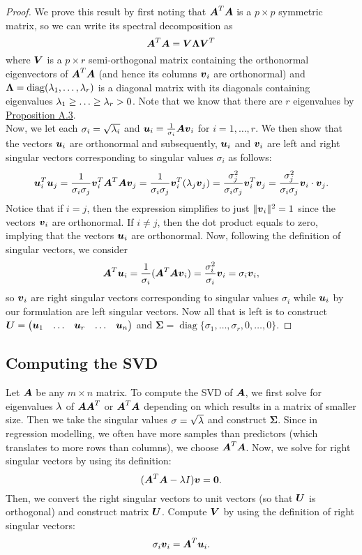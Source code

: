 \documentclass[12pt]{article}
\DeclareMathOperator{\diag}{diag}
\newcommand{\Sg}{\Sigma}
\begin{document}
	\begin{proof}
		We prove this result by first noting that $\boldsymbol{A}^T\boldsymbol{A}$ is a $p\times p$ symmetric matrix, so we can write its spectral decomposition as
		$$\boldsymbol{A}^T\boldsymbol{A}=\boldsymbol{V}\boldsymbol{\Lambda}\boldsymbol{V}^T$$
		where $\boldsymbol{V}$ is a $p\times r$ {semi-orthogonal} matrix containing the orthonormal eigenvectors of $\boldsymbol{A}^T\boldsymbol{A}$ (and hence its columns $\boldsymbol{v}_i$ are orthonormal) and $\boldsymbol{\Lambda}=\diag(\lm_1,\ldots,\lm_r)$ is a diagonal matrix with its diagonals containing eigenvalues $\lambda_1\geq\ldots\geq\lambda_r>0$. Note that we know that there are $r$ eigenvalues by \hyperref[prop1]{Proposition A.3}. \\
		
		Now, we let each $\sigma_i=\sqrt{\lambda_i}$ and $\boldsymbol{u}_i=\frac{1}{\sigma_i}\boldsymbol{A}\boldsymbol{v}_i$ for $i=1,\ldots,r$. We then show that the vectors $\boldsymbol{u}_i$ are orthonormal and subsequently, $\boldsymbol{u}_i$ and $\boldsymbol{v}_i$ are left and right singular vectors corresponding to singular values $\sigma_i$ as follows:
		\begin{align*}
			\boldsymbol{u}_i^T\boldsymbol{u}_j
			=\frac{1}{\sigma_i\sigma_j}\boldsymbol{v}_i^T{\boldsymbol{A}^T\boldsymbol{A}\boldsymbol{v}_j}
			=\frac{1}{\sigma_i\sigma_j}\boldsymbol{v}_i^T({\lambda_j\boldsymbol{v}_j})
			=\frac{\sigma_j^2}{\sigma_i\sigma_j}\boldsymbol{v}_i^T\boldsymbol{v}_j
			=\frac{\sigma_j^2}{\sigma_i\sigma_j}\boldsymbol{v}_i\cdot\boldsymbol{v}_j.
		\end{align*}
		Notice that if $i=j$, then the expression simplifies to just $\|\boldsymbol{v}_i\|^2=1$ since the vectors $\boldsymbol{v}_i$ are orthonormal. If $i\neq j$, then the dot product equals to zero, implying that the vectors $\boldsymbol{u}_i$ are orthonormal. Now, following the definition of singular vectors, we consider
		$$\boldsymbol{A}^T{\boldsymbol{u}_i}={\frac{1}{\sigma_i}}(\boldsymbol{A}^T{\boldsymbol{A}\boldsymbol{v}_i})=\frac{{\sigma_i^2}}{\sigma_i}{\boldsymbol{v}_i}=\sigma_i\boldsymbol{v}_i,$$
		so $\boldsymbol{v}_i$ are right singular vectors corresponding to singular values $\sigma_i$ while $\boldsymbol{u}_i$ by our formulation are left singular vectors. Now all that is left is to construct $\boldsymbol{U}=\begin{pmatrix}
			\boldsymbol{u}_1 & \ldots & \boldsymbol{u}_r & \ldots & \boldsymbol{u}_n
		\end{pmatrix}$ and $\boldsymbol{\Sg}=\diag\{\sigma_1,\ldots,\sigma_r,0,\ldots,0\}$. 
	\end{proof}
	
	\subsection{Computing the SVD}
	Let $\boldsymbol{A}$ be any $m\times n$ matrix. To compute the SVD of $\boldsymbol{A}$, we first solve for eigenvalues $\lambda$ of $\boldsymbol{A}\boldsymbol{A}^T$ or $\boldsymbol{A}^T\boldsymbol{A}$ depending on which results in a matrix of smaller size. Then we take the singular values $\sigma=\sqrt{\lambda}$ and construct $\boldsymbol{\Sg}$. Since in regression modelling, we often have more samples than predictors (which translates to more rows than columns), we choose $\boldsymbol{A}^T\boldsymbol{A}$. Now, we solve for right singular vectors by using its definition:
	$$(\boldsymbol{A}^T\boldsymbol{A}-\lambda I)\boldsymbol{v}=\textbf{0}.$$
	Then, we convert the right singular vectors to unit vectors (so that $\boldsymbol{U}$ is orthogonal) and construct matrix $\boldsymbol{U}$. Compute $\boldsymbol{V}$ by using the definition of right singular vectors:
	$$\sigma_i\boldsymbol{v}_i=\boldsymbol{A}^T\boldsymbol{u}_i.$$
	
\end{document}
